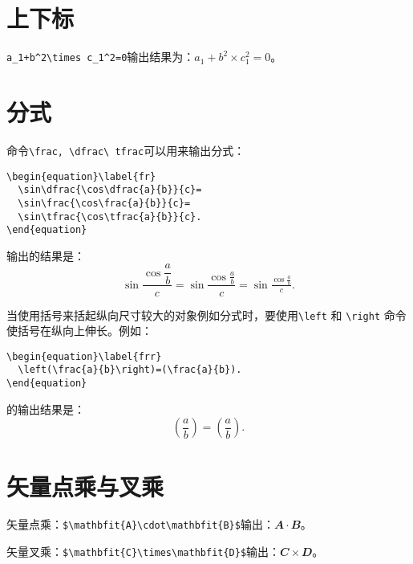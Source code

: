 \section{上下标}\label{section4-1}
\verb|a_1+b^2\times c_1^2=0|输出结果为：$a_1+b^2\times c_1^2=0$。

\section{分式}\label{section4-2}
命令\verb|\frac, \dfrac\ tfrac|可以用来输出分式：
\begin{verbatim}
\begin{equation}\label{fr}
  \sin\dfrac{\cos\dfrac{a}{b}}{c}=
  \sin\frac{\cos\frac{a}{b}}{c}=
  \sin\tfrac{\cos\tfrac{a}{b}}{c}.
\end{equation}
\end{verbatim}
输出的结果是：
\begin{equation}\label{fr}
\sin\dfrac{\cos\dfrac{a}{b}}{c}=
\sin\frac{\cos\frac{a}{b}}{c}=
\sin\tfrac{\cos\tfrac{a}{b}}{c}.
\end{equation}

当使用括号来括起纵向尺寸较大的对象例如分式时，要使用\verb|\left| 和
\verb|\right| 命令使括号在纵向上伸长。例如：
\begin{verbatim}
\begin{equation}\label{frr}
  \left(\frac{a}{b}\right)=(\frac{a}{b}).
\end{equation}
\end{verbatim}
的输出结果是：
\begin{equation}\label{frr}
\left(\frac{a}{b}\right)=(\frac{a}{b}).
\end{equation}

\section{矢量点乘与叉乘}\label{section4-3}
矢量点乘：\verb|$\mathbfit{A}\cdot\mathbfit{B}$|输出：$\mathbfit{A}\cdot\mathbfit{B}$。

矢量叉乘：\verb|$\mathbfit{C}\times\mathbfit{D}$|输出：$\mathbfit{C}\times\mathbfit{D}$。

